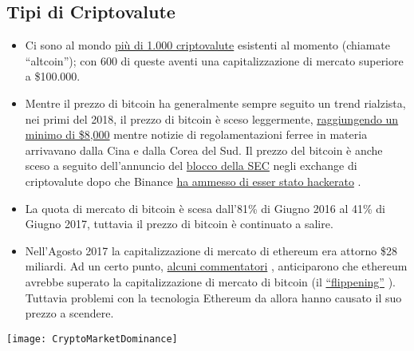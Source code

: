 \documentclass[11pt,fleqn]{book} %
\begin{document}
	\subsection{Tipi di Criptovalute}
		\begin{itemize}
			\item Ci sono al mondo \href{https://coinmarketcap.com/all/views/all/}{più di 1.000 criptovalute} 
			\cite{coinmarketcapAll}	esistenti al momento (chiamate ``altcoin''); 
			con 600 di queste aventi una capitalizzazione di mercato superiore a \$100.000.
			\item Mentre il prezzo di bitcoin ha generalmente sempre seguito un trend rialzista, nei primi del 2018, 
			il prezzo di bitcoin è sceso leggermente,
			\href{https://www.cnbc.com/2018/02/05/bitcoin-price-drops-below-8000-over-60-billion-wiped-off-cryptocurrencies.html}{raggiungendo un minimo di \$8,000} 
			\cite{cnbcBitcoinPriceSurge}
			mentre notizie di regolamentazioni ferree in materia arrivavano dalla Cina e dalla Corea del Sud.
			Il prezzo del bitcoin è anche sceso a seguito dell'annuncio del
			\href{http://www.latimes.com/business/la-fi-bitcoin-sec-registration-20180307-story.html}{blocco della SEC} 
			\cite{laTimes}
			negli exchange di criptovalute dopo che Binance
			\href{https://www.ft.com/content/58a32050-22aa-11e8-add1-0e8958b189ea}{ha ammesso di esser stato hackerato}
			\cite{ftBinanceHack}.
			\item La quota di mercato di bitcoin è scesa dall'81\% di Giugno 2016 al 41\% di Giugno 2017, tuttavia
			il prezzo di bitcoin è continuato a salire.
			\item Nell'Agosto 2017 la capitalizzazione di mercato di ethereum era attorno \$28 miliardi. Ad un certo punto,
			\href{http://www.zerohedge.com/news/2017-05-31/ethereum-forecast-surpass-bitcoin-2018}{alcuni commentatori}
			\cite{zeroHedge}, 
			anticiparono che ethereum avrebbe superato la capitalizzazione di mercato di bitcoin (il 
			\href{https://www.flippening.watch/}{``flippening''} \cite{flippening}). 
			Tuttavia problemi con la tecnologia Ethereum da allora hanno causato il suo prezzo a scendere.
		\end{itemize}
		\begin{center}
			\texttt{[image: CryptoMarketDominance]}
		\end{center}
\end{document}
